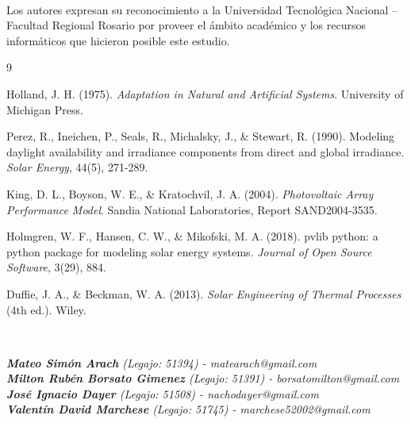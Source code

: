 \documentclass[12pt, a4paper, twocolumn]{article}
\begin{document}
\vspace{0.4cm}

 \\
{\fontsize{10}{12}\selectfont
Los autores expresan su reconocimiento a la Universidad Tecnológica Nacional – Facultad Regional Rosario por proveer el ámbito académico y los recursos informáticos que hicieron posible este estudio.
\par}

\vspace{0.4cm}

\small
\begin{thebibliography}{9}

Holland, J. H. (1975). \textit{Adaptation in Natural and Artificial Systems}. University of Michigan Press.

Perez, R., Ineichen, P., Seals, R., Michalsky, J., \& Stewart, R. (1990). Modeling daylight availability and irradiance components from direct and global irradiance. \textit{Solar Energy}, 44(5), 271-289.

King, D. L., Boyson, W. E., \& Kratochvil, J. A. (2004). \textit{Photovoltaic Array Performance Model}. Sandia National Laboratories, Report SAND2004-3535.

Holmgren, W. F., Hansen, C. W., \& Mikofski, M. A. (2018). pvlib python: a python package for modeling solar energy systems. \textit{Journal of Open Source Software}, 3(29), 884.

Duffie, J. A., \& Beckman, W. A. (2013). \textit{Solar Engineering of Thermal Processes} (4th ed.). Wiley.

\end{thebibliography}

\normalsize
\vspace{0.4cm}

 \\
{\fontsize{10}{12}\selectfont\itshape
\textbf{Mateo Simón Arach} (Legajo: 51394) - matearach@gmail.com \\
\textbf{Milton Rubén Borsato Gimenez} (Legajo: 51391) - borsatomilton@gmail.com \\
\textbf{José Ignacio Dayer} (Legajo: 51508) - nachodayer@gmail.com \\
\textbf{Valentín David Marchese} (Legajo: 51745) - marchese52002@gmail.com
\par}
\end{document}
